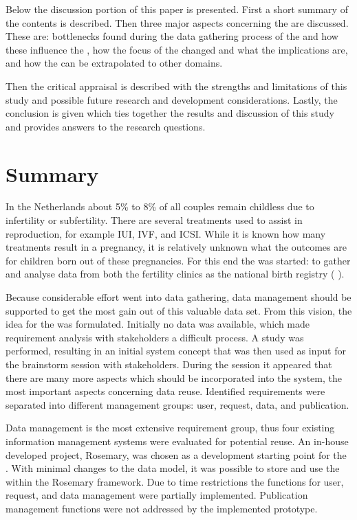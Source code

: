Below the discussion portion of this paper is presented.
First a short summary of the contents is described.
Then three major aspects concerning the \ivfsystem{} are discussed.
These are: bottlenecks found during the data gathering process of the \projectdata{} and how these influence the \ivfsystem{}, how the focus of the \ivfsystem{} changed and what the implications are, and how the \ivfsystem{} can be extrapolated to other domains.

Then the critical appraisal is described with the strengths and limitations of this study and possible future research and development considerations.
Lastly, the conclusion is given which ties together the results and discussion of this study and provides answers to the research questions.

\section{Summary}

In the Netherlands about 5\% to 8\% of all couples remain childless due to infertility or subfertility.
There are several treatments used to assist in reproduction, for example IUI, IVF, and ICSI.
While it is known how many treatments result in a pregnancy, it is relatively unknown what the outcomes are for children born out of these pregnancies.
For this end the \project{} was started: to gather and analyse data from both the fertility clinics as the national birth registry (\ie{} \PRN{}).

Because considerable effort went into data gathering, data management should be supported to get the most gain out of this valuable data set.
From this vision, the idea for the \ivfsystem{} was formulated.
Initially no data was available, which made requirement analysis with stakeholders a difficult process.
A study was performed, resulting in an initial system concept that was then used as input for the brainstorm session with stakeholders.
During the session it appeared that there are many more aspects which should be incorporated into the system, the most important aspects concerning data reuse.
Identified requirements were separated into different management groups: user, request, data, and publication.

Data management is the most extensive requirement group, thus four existing information management systems were evaluated for potential reuse.
An in-house developed project, Rosemary, was chosen as a development starting point for the \ivfsystem{}.
With minimal changes to the data model, it was possible to store and use the \projectdata{} within the Rosemary framework.
Due to time restrictions the functions for user, request, and data management were partially implemented.
Publication management functions were not addressed by the implemented prototype.

